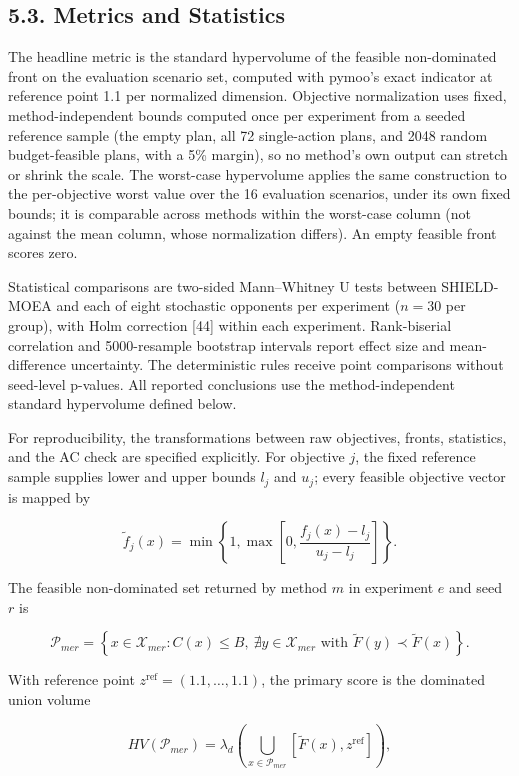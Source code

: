 \documentclass[
  10pt,
  a4paper,
]{article}
\begin{document}
\subsection{5.3. Metrics and Statistics}\label{metrics-and-statistics}

The headline metric is the standard hypervolume of the feasible
non-dominated front on the evaluation scenario set, computed with
pymoo's exact indicator at reference point 1.1 per normalized dimension.
Objective normalization uses fixed, method-independent bounds computed
once per experiment from a seeded reference sample (the empty plan, all
72 single-action plans, and 2048 random budget-feasible plans, with a
5\% margin), so no method's own output can stretch or shrink the scale.
The worst-case hypervolume applies the same construction to the
per-objective worst value over the 16 evaluation scenarios, under its
own fixed bounds; it is comparable across methods within the worst-case
column (not against the mean column, whose normalization differs). An
empty feasible front scores zero.

Statistical comparisons are two-sided Mann--Whitney U tests between
SHIELD-MOEA and each of eight stochastic opponents per experiment
(\(n=30\) per group), with Holm correction {[}44{]} within each
experiment. Rank-biserial correlation and 5000-resample bootstrap
intervals report effect size and mean-difference uncertainty. The
deterministic rules receive point comparisons without seed-level
p-values. All reported conclusions use the method-independent standard
hypervolume defined below.

For reproducibility, the transformations between raw objectives, fronts,
statistics, and the AC check are specified explicitly. For objective
\(j\), the fixed reference sample supplies lower and upper bounds
\(l_j\) and \(u_j\); every feasible objective vector is mapped by

\[
\tilde f_j(x)=\min\!\left\{1,\max\!\left[0,\frac{f_j(x)-l_j}{u_j-l_j}\right]\right\}.
\]

The feasible non-dominated set returned by method \(m\) in experiment
\(e\) and seed \(r\) is

\[
\mathcal{P}_{mer}=\left\{x\in\mathcal{X}_{mer}:C(x)\leq B,\ \nexists y\in\mathcal{X}_{mer}\text{ with }\tilde F(y)\prec\tilde F(x)\right\}.
\]

With reference point \(z^{\mathrm{ref}}=(1.1,\ldots,1.1)\), the primary
score is the dominated union volume

\[
HV(\mathcal{P}_{mer})=\lambda_d\!\left(\bigcup_{x\in\mathcal{P}_{mer}}[\tilde F(x),z^{\mathrm{ref}}]\right),
\]
\end{document}
